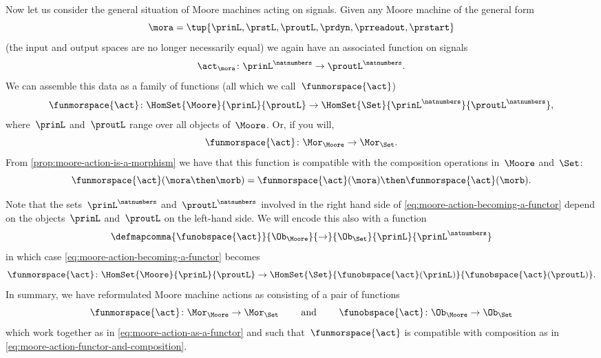 Now let us consider the general situation of Moore machines acting on signals.
Given any Moore machine of the general form
\begin{equation}
    \mora = \tup{\prinL,\prstL,\proutL,\prdyn,\prreadout,\prstart}
\end{equation}
(the input and output spaces are no longer necessarily equal) we again have an associated function on signals
\begin{equation}
    \act_{\mora} \colon {\prinL}^\natnumbers \to {\proutL}^\natnumbers.
\end{equation}
We can assemble this data as a family of functions (all which we call~$\funmorspace{\act}$)
\begin{equation}
    \label{eq:moore-action-becoming-a-functor}
    \funmorspace{\act} \colon  \HomSet{\Moore}{\prinL}{\proutL} \to \HomSet{\Set}{\prinL^{\natnumbers}}{\proutL^{\natnumbers}},
\end{equation}
where~$\prinL$ and~$\proutL$ range over all objects of~$\Moore$.
Or, if you will,
\begin{equation}
    \funmorspace{\act} \colon \Mor_\Moore \to \Mor_\Set.
\end{equation}
From \cref{prop:moore-action-is-a-morphism} we have that this function is compatible with the composition operations in~$\Moore$ and~$\Set$:
\begin{equation}
    \label{eq:moore-action-functor-and-composition}
    \funmorspace{\act}(\mora \then \morb) = \funmorspace{\act}(\mora) \then \funmorspace{\act}(\morb).
\end{equation}

Note that the sets~$\prinL^{\natnumbers}$ and~$\proutL^{\natnumbers}$ involved in the right hand side of \cref{eq:moore-action-becoming-a-functor} depend on the objects~$\prinL$ and~$\proutL$ on the left-hand side.
We will encode this also with a function
\begin{equation}
    \defmapcomma{\funobspace{\act}}
    {\Ob_{\Moore}}
    {\to}
    {\Ob_{\Set}}
    {\prinL}
    {\prinL^\natnumbers}
\end{equation}
in which case \cref{eq:moore-action-becoming-a-functor} becomes
\begin{equation}
    \label{eq:moore-action-as-a-functor}
    \funmorspace{\act} \colon  \HomSet{\Moore}{\prinL}{\proutL} \to \HomSet{\Set}{ \funobspace{\act}(\prinL)}{\funobspace{\act}(\proutL)}.
\end{equation}
%
In summary, we have reformulated Moore machine actions as consisting of a pair of functions
\begin{equation}
    \funmorspace{\act} \colon \Mor_\Moore \to \Mor_\Set \qquad \text{ and } \qquad \funobspace{\act} \colon \Ob_{\Moore} \to \Ob_{\Set}
\end{equation}
which work together as in \cref{eq:moore-action-as-a-functor} and such that~$\funmorspace{\act}$ is compatible with composition as in \cref{eq:moore-action-functor-and-composition}.

